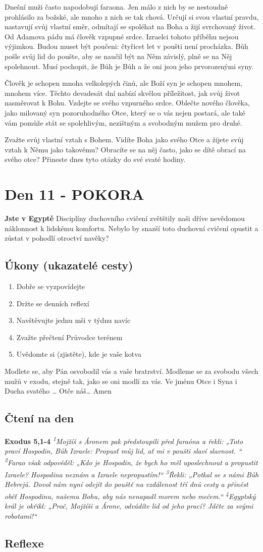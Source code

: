\documentclass[11pt]{article}
\newcommand{\zacatekDruhyTyden}{
  \textbf{Jste v Egyptě} \newline
  Disciplíny duchovního cvičení zvětštily naši dříve nevědomou náklonnost k lidskému komfortu.
  Nebylo by snazší toto duchovní cvičení opustit a zůstat v pohodlí otroctví navěky?

  \subsection*{Úkony (ukazatelé cesty)}
\begin{enumerate}
  \item Dobře se vyzpovídejte
  \item Držte se denních reflexí
  \item Navštěvujte jednu mši v týdnu navíc
  \item Zvažte přečtení Průvodce terénem
  \item Uvědomte si (zjistěte), kde je vaše kotva
\end{enumerate}
Modlete se, aby Pán osvobodil vás a vaše bratrství. \newline
Modleme se za svobodu všech mužů v exodu, stejně tak, jako se oni modlí za vás.\newline
Ve jménu Otce i Syna i Ducha svatého …  Otče náš… Amen
}
\begin{document}
Dnešní muži často napodobují faraona. Jen málo z nich by se nestoudně prohlásilo za božské, ale mnoho z nich se
tak chová. Určují si svou vlastní pravdu, nastavují svůj vlastní směr, odmítají se spoléhat na Boha a žijí svrchovaný
život. Od Adamova pádu má člověk vzpupné srdce. Izraelci tohoto příběhu nejsou výjimkou. Budou muset být
poučeni: čtyřicet let v poušti není procházka. Bůh pošle svůj lid do poušte, aby se naučil být na Něm závislý, plně se
na Něj spolehnout. Musí pochopit, že Bůh je Bůh a že oni jsou jeho prvorozenými syny.

Člověk je schopen mnoha velkolepých činů, ale Boží syn je schopen mnohem, mnohem více. Těchto devadesát dní
nabízí skvělou příležitost, jak svůj život nasměrovat k Bohu. Vzdejte se svého vzpurného srdce. Oblečte nového
člověka, jako milovaný syn pozoruhodného Otce, který se o vás nejen postará, ale také vám pomůže stát se
spolehlivým, nezištným a svobodným mužem pro druhé.

Zvažte svůj vlastní vztah s Bohem. Vidíte Boha jako svého Otce a žijete svůj vztah k Němu jako takovému?
Obracíte se na něj často, jako se dítě obrací na svého otce? Přineste dnes tyto otázky do své svaté hodiny.

\newpage
\section{Den 11 - POKORA}
\zacatekDruhyTyden
\subsection*{Čtení na den}
\textbf{Exodus 5,1-4}
\newline
\textit{
\textsuperscript{1}Mojžíš s Áronem pak předstoupili před faraóna a řekli: „Toto praví Hospodin, Bůh Izraele: Propusť můj lid, ať mi v poušti slaví slavnost. “
\textsuperscript{2}Farao však odpověděl: „Kdo je Hospodin, že bych ho měl uposlechnout a propustit Izraele? Hospodina neznám a Izraele nepropustím!“
\textsuperscript{3}Řekli: „Potkal se s námi Bůh Hebrejů. Dovol nám nyní odejít do pouště na vzdálenost tří dnů cesty a přinést oběť Hospodinu, našemu Bohu, aby nás nenapadl morem nebo mečem.“
\textsuperscript{4}Egyptský král je okřikl: „Proč, Mojžíši a Árone, odvádíte lid od jeho prací? Jděte za svými robotami!“
}

\newpage
\subsection*{Reflexe}
\end{document}
